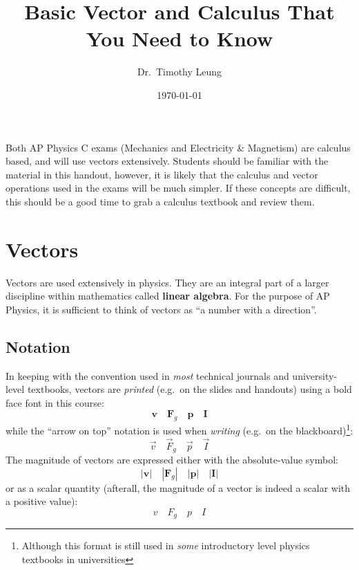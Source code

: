 \documentclass{../../oss-handout}
\title{Basic Vector and Calculus That You Need to Know}
\author{Dr.\ Timothy Leung}
\date{\today}
\begin{document}
\thispagestyle{title}
\gentitle


Both AP Physics C exams (Mechanics and Electricity \& Magnetism) are calculus
based, and will use vectors extensively.
Students should be familiar with the material in this handout, however, it is
likely that the calculus and vector operations used in the exams will be much
simpler. If these concepts are difficult, this should be a good time to grab a
calculus textbook and review them.

\section{Vectors}
Vectors are used extensively in physics. They are an integral part of a larger
discipline within mathematics called \textbf{linear algebra}. For the purpose
of AP Physics, it is sufficient to think of vectors as
``a number with a direction''.

\subsection{Notation}
In keeping with the convention used in \emph{most} technical journals and
university-level textbooks, vectors are \emph{printed} (e.g.\ on the slides and
handouts) using a bold face font in this course:
\begin{equation*}
  \bm{v}\quad\bm{F}_g\quad\bm{p}\quad\bm{I}
\end{equation*}
while the ``arrow on top'' notation is used when \emph{writing} (e.g.\ on the
blackboard)\footnote{Although this format is still used in \emph{some}
  introductory level physics textbooks in universities}:
\begin{equation*}
  \vec{v}\quad\vec{F}_g\quad\vec{p}\quad\vec{I}
\end{equation*}
The magnitude of vectors are expressed either with the absolute-value symbol:
\begin{equation*}
  |\bm{v}|\quad|\bm{F}_g|\quad|\bm{p}|\quad|\bm{I}|
\end{equation*}
or as a scalar quantity (afterall, the magnitude of a vector is indeed a scalar
with a positive value):
\begin{equation*}
  v\quad F_g\quad p \quad I
\end{equation*}
\end{document}
